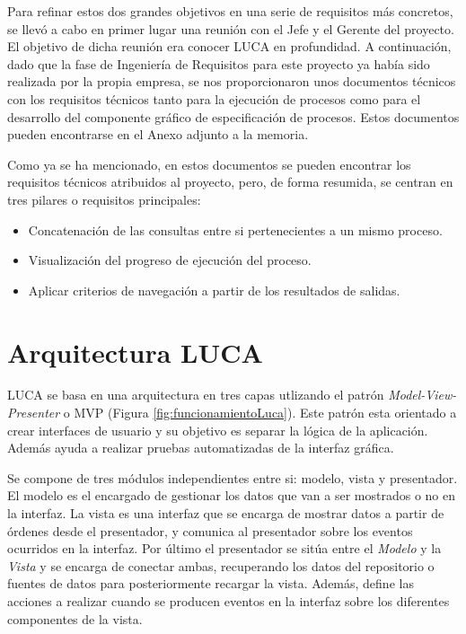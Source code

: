 Para refinar estos dos grandes objetivos en una serie de requisitos más concretos, se llevó a cabo en primer lugar una reunión con el Jefe y el Gerente del proyecto. El objetivo de dicha reunión era conocer LUCA en profundidad. A continuación, dado que la fase de Ingeniería de Requisitos para este proyecto ya había sido realizada por la propia empresa, se nos proporcionaron unos documentos técnicos con los requisitos técnicos tanto para la ejecución de procesos como para el desarrollo del componente gráfico de especificación de procesos. Estos documentos pueden encontrarse en el Anexo adjunto a la memoria.


Como ya se ha mencionado, en estos documentos se pueden encontrar los requisitos técnicos atribuidos al proyecto, pero, de forma resumida, se centran en tres pilares o requisitos principales:



\begin{itemize}
	\item Concatenación de las consultas entre si pertenecientes a un mismo proceso.
	\item Visualización del progreso de ejecución del proceso.
	\item Aplicar criterios de navegación a partir de los resultados de salidas.
\end{itemize}


\section{Arquitectura LUCA}

LUCA se basa en una arquitectura en tres capas utlizando el patrón \emph{Model-View-Presenter} o MVP\cite{mvp} (Figura \ref{fig:funcionamientoLuca}). Este patrón esta orientado a crear interfaces de usuario y su objetivo es separar la lógica de la aplicación. Además ayuda a realizar pruebas automatizadas de la interfaz gráfica. 

Se compone de tres módulos independientes entre si: modelo, vista y presentador. El modelo es el encargado de gestionar los datos que van a ser mostrados o no en la interfaz. La vista es una interfaz que se encarga de mostrar datos a partir de órdenes desde el presentador, y comunica al presentador sobre los eventos ocurridos en la interfaz. Por último el presentador se sitúa entre el \emph{Modelo} y la \emph{Vista} y se encarga de conectar ambas, recuperando los datos del repositorio o fuentes de datos para posteriormente recargar la vista. Además, define las acciones a realizar cuando se producen eventos en la interfaz sobre los diferentes componentes de la vista.

